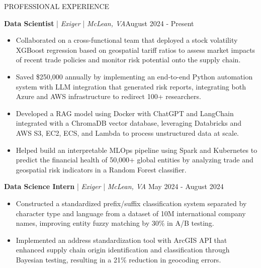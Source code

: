\begin{rSection}{PROFESSIONAL EXPERIENCE}
    \renewcommand{\labelitemi}{\rule{0.8ex}{0.8ex}}

    \textbf{Data Scientist} | \textit{Exiger} | \textit{McLean, VA}\hfill August 2024 - Present\\
    \begin{itemize}[leftmargin=12pt]
        \itemsep -4pt {} \vspace{-1.4em}
        \item Collaborated on a cross-functional team that deployed a stock volatility XGBoost regression based on geospatial tariff ratios to assess market impacts of recent trade policies and monitor risk potential onto the supply chain. 
        \item Saved \$250,000 annually by implementing an end-to-end Python automation system with LLM integration that generated risk reports, integrating both Azure and AWS infrastructure to redirect 100+ researchers.
        \item Developed a RAG model using Docker with ChatGPT and LangChain integrated with a ChromaDB vector database, leveraging Databricks and AWS S3, EC2, ECS, and Lambda to process unstructured data at scale.
        \item Helped build an interpretable MLOps pipeline using Spark and Kubernetes to predict the financial health of 50,000+ global entities by analyzing trade and geospatial risk indicators in a Random Forest classifier.
    \end{itemize}
    
    \textbf{Data Science Intern} | \textit{Exiger} | \textit{McLean, VA} \hfill May 2024 - August 2024\\
    \begin{itemize}[leftmargin=12pt]
        \itemsep -4pt {} \vspace{-1.4em}
        \item Constructed a standardized prefix/suffix classification system separated by character type and language from a dataset of 10M international company names, improving entity fuzzy matching by 30\% in A/B testing.
        \item Implemented an address standardization tool with ArcGIS API that enhanced supply chain origin identification and classification through Bayesian testing, resulting in a 21\% reduction in geocoding errors.    
    \end{itemize}
    

\end{rSection}
